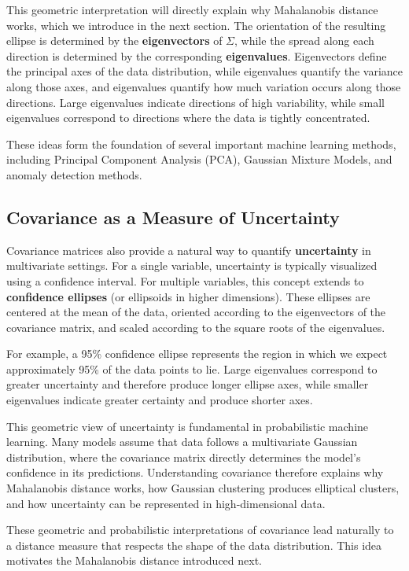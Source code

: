 \documentclass{article}
\begin{document}
This geometric interpretation will directly explain why Mahalanobis
distance works, which we introduce in the next section. The orientation of the resulting ellipse is determined by the 
\textbf{eigenvectors} of $\Sigma$, while the spread along each direction is 
determined by the corresponding \textbf{eigenvalues}. Eigenvectors define the principal axes of the data distribution,
while eigenvalues quantify the variance along those axes, and eigenvalues 
quantify how much variation occurs along those directions. Large eigenvalues 
indicate directions of high variability, while small eigenvalues correspond to 
directions where the data is tightly concentrated.

These ideas form the foundation of several important machine learning methods, 
including Principal Component Analysis (PCA), Gaussian Mixture Models, and 
anomaly detection methods.

\subsection*{Covariance as a Measure of Uncertainty}

Covariance matrices also provide a natural way to quantify \textbf{uncertainty} 
in multivariate settings. For a single variable, uncertainty is typically 
visualized using a confidence interval. For multiple variables, this concept 
extends to \textbf{confidence ellipses} (or ellipsoids in higher dimensions). 
These ellipses are centered at the mean of the data, oriented according to the 
eigenvectors of the covariance matrix, and scaled according to the square roots 
of the eigenvalues.

For example, a 95\% confidence ellipse represents the region in which we expect 
approximately 95\% of the data points to lie. Large eigenvalues correspond to 
greater uncertainty and therefore produce longer ellipse axes, while smaller 
eigenvalues indicate greater certainty and produce shorter axes.

This geometric view of uncertainty is fundamental in probabilistic machine 
learning. Many models assume that data follows a multivariate Gaussian 
distribution, where the covariance matrix directly determines the model’s 
confidence in its predictions. Understanding covariance therefore explains why Mahalanobis distance works,
how Gaussian clustering produces elliptical clusters, and how uncertainty can be represented in high-dimensional data.

These geometric and probabilistic interpretations of covariance lead
naturally to a distance measure that respects the shape of the data
distribution. This idea motivates the Mahalanobis distance introduced
next.
\end{document}
